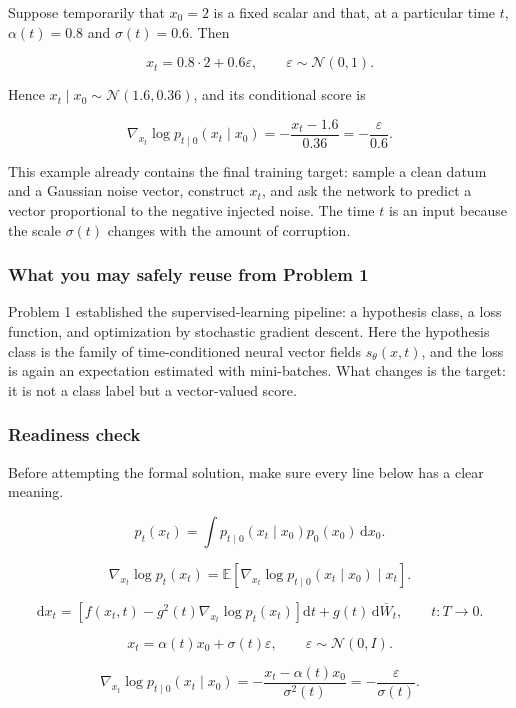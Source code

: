 \documentclass[11pt,a4paper]{article}
\theoremstyle{definition}
\begin{document}
Suppose temporarily that $x_0=2$ is a fixed scalar and that, at a particular time $t$, $\alpha(t)=0.8$ and $\sigma(t)=0.6$. Then

\[
x_t = 0.8\cdot 2 + 0.6\varepsilon,
\qquad
\varepsilon \sim \mathcal{N}(0,1).
\]

Hence $x_t\mid x_0 \sim \mathcal{N}(1.6,0.36)$, and its conditional score is

\[
\nabla_{x_t}\log p_{t\mid 0}(x_t\mid x_0)
= -\frac{x_t-1.6}{0.36}
= -\frac{\varepsilon}{0.6}.
\]

This example already contains the final training target: sample a clean datum and a Gaussian noise vector, construct $x_t$, and ask the network to predict a vector proportional to the negative injected noise. The time $t$ is an input because the scale $\sigma(t)$ changes with the amount of corruption.

\subsubsection{What you may safely reuse from Problem 1}

Problem 1 established the supervised-learning pipeline: a hypothesis class, a loss function, and optimization by stochastic gradient descent. Here the hypothesis class is the family of time-conditioned neural vector fields $s_\theta(x,t)$, and the loss is again an expectation estimated with mini-batches. What changes is the target: it is not a class label but a vector-valued score.

\subsubsection{Readiness check}

Before attempting the formal solution, make sure every line below has a clear meaning.

\[
p_t(x_t) = \int p_{t\mid 0}(x_t\mid x_0)p_0(x_0)\,\mathrm{d}x_0.
\]

\[
\nabla_{x_t}\log p_t(x_t)
= \mathbb{E}\left[\nabla_{x_t}\log p_{t\mid 0}(x_t\mid x_0)\mid x_t\right].
\]

\[
\mathrm{d}x_t
= \left[f(x_t,t)-g^2(t)\nabla_{x_t}\log p_t(x_t)\right]\mathrm{d}t
+ g(t)\,\mathrm{d}\overline{W}_t,
\qquad t:T\to 0.
\]

\[
x_t = \alpha(t)x_0+\sigma(t)\varepsilon,
\qquad
\varepsilon\sim\mathcal{N}(0,I).
\]

\[
\nabla_{x_t}\log p_{t\mid 0}(x_t\mid x_0)
= -\frac{x_t-\alpha(t)x_0}{\sigma^2(t)}
= -\frac{\varepsilon}{\sigma(t)}.
\]
\end{document}
